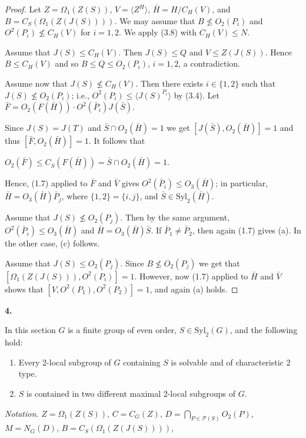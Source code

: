 \documentclass[11pt]{article}
\theoremstyle{plain}
\theoremstyle{stmplain}
\newcommand{\sect}[1]{\stepcounter{section}\par\vspace{14pt}%
  \begin{center}\textbf{#1.}\end{center}\vspace{2pt}}
\newcommand{\disp}[1]{\begin{center}$\displaystyle #1$\end{center}}
\begin{document}
\begin{proof}
Let $Z = \Omega_1(Z(S))$, $V = \langle Z^H \rangle$, $\bar{H} = H/C_H(V)$, and
$B = C_S(\Omega_1(Z(J(S))))$. We may assume that $B \nleq O_2(P_i)$ and
$O^2(P_i) \nleq C_H(V)$ for $i = 1, 2$. We apply (3.8) with $C_H(V) \le N$.

\smallskip
\noindent Assume that $J(S) \le C_H(V)$. Then $J(S) \le Q$ and $V \le Z(J(S))$.
Hence $B \le C_H(V)$ and so $B \le Q \le O_2(P_i)$, $i = 1, 2$, a contradiction.

\smallskip
\noindent Assume now that $J(S) \nleq C_H(V)$. Then there exists $i \in \{1, 2\}$
such that $J(S) \nleq O_2(P_i)$; i.e., $O^2(P_i) \le \langle J(S)^{P_i} \rangle$
by (3.4). Let $\bar{F} = O_2(F(\bar{H})) \cdot O^2(\bar{P}_i)J(\bar{S})$.

\noindent Since $J(S) = J(T)$ and $\bar{S} \cap O_2(\bar{H}) = 1$ we get
$[J(\bar{S}), O_2(\bar{H})] = 1$ and thus $[\bar{F}, O_2(\bar{H})] = 1$. It
follows that
\disp{O_2(\bar{F}) \le C_{\bar{S}}(F(\bar{H})) = \bar{S} \cap O_2(\bar{H}) = 1.}
Hence, (1.7) applied to $\bar{F}$ and $\bar{V}$ gives $O^2(\bar{P}_i) \le
O_3(\bar{H})$; in particular, $\bar{H} = O_3(\bar{H})\bar{P}_j$, where $\{1, 2\}
= \{i, j\}$, and $\bar{S} \in \mathrm{Syl}_2(\bar{H})$.

\smallskip
\noindent Assume that $J(S) \nleq O_2(P_j)$. Then by the same argument, $O^2(\bar{P}_i)
\le O_3(\bar{H})$ and $\bar{H} = O_3(\bar{H})\bar{S}$. If $\bar{P}_1 \ne
\bar{P}_2$, then again (1.7) gives (a). In the other case, (c) follows.

\smallskip
\noindent Assume that $J(S) \le O_2(P_j)$. Since $B \nleq O_2(P_j)$ we get that
$[\Omega_1(Z(J(S))), O^2(P_i)] = 1$. However, now (1.7) applied to $\bar{H}$
and $\bar{V}$ shows that $[V, O^2(P_1), O^2(P_2)] = 1$, and again (a) holds.
\end{proof}

\sect{4}

\noindent In this section $G$ is a finite group of even order, $S \in
\mathrm{Syl}_2(G)$, and the following hold:
\begin{enumerate}
\item[(a)] Every 2-local subgroup of $G$ containing $S$ is solvable and of
  characteristic 2 type.
\item[(b)] $S$ is contained in two different maximal 2-local subgroups of $G$.
\end{enumerate}

\smallskip
\noindent\textit{Notation.} \quad $Z = \Omega_1(Z(S))$, $C = C_G(Z)$, $D =
\bigcap_{P \in \mathcal{P}(S)} O_2(P)$, $M = N_G(D)$, $B = C_S(\Omega_1(Z(J(S))))$,
\end{document}
